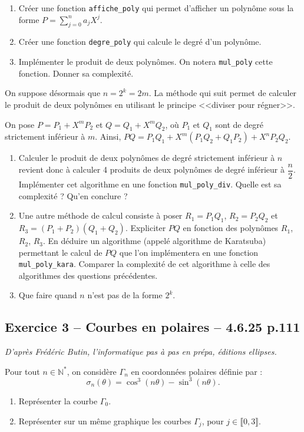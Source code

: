 \documentclass[10pt,fleqn]{article} %
\begin{document}
\begin{multicols}{2}
\begin{enumerate}
\item Créer une fonction \texttt{affiche\_poly} qui permet d'afficher un polynôme sous la forme $P=\sum\limits_{j=0}^{n}a_j X^j$.
\item Créer une fonction \texttt{degre\_poly} qui calcule le degré d'un polynôme.
\item Implémenter le produit de deux polynômes. On notera \texttt{mul\_poly} cette fonction. Donner sa complexité.
\end{enumerate}
On suppose désormais que $n=2^k=2m$. La méthode qui suit permet de calculer le produit de deux polynômes en utilisant le principe <<diviser pour régner>>. 

On pose $P=P_1+X^m P_2$ et $Q=Q_1+X^mQ_2$, où $P_1$ et $Q_1$ sont de degré strictement inférieur à $m$. Ainsi, $PQ=P_1Q_1+X^m\left(P_1Q_2 + Q_1P_2\right)+X^n P_2 Q_2$. 

\begin{enumerate}
\item Calculer le produit de deux polynômes de degré strictement inférieur à $n$ revient donc à calculer 4 produits de deux polynômes de degré inférieur à $\dfrac{n}{2}$. Implémenter cet algorithme en une fonction \texttt{mul\_poly\_div}. Quelle est sa complexité ? Qu'en conclure ?
\item Une autre méthode de calcul consiste à poser $R_1=P_1Q_1$, $R_2=P_2Q_2$ et $R_3=\left(P_1+P_2 \right)\left(Q_1+Q_2 \right)$. Expliciter $PQ$ en fonction des polynômes $R_1$, $R_2$, $R_3$. En déduire un algorithme (appelé algorithme de Karatsuba) permettant le calcul de $PQ$ que l'on implémentera en une fonction \texttt{mul\_poly\_kara}. Comparer la complexité de cet algorithme à celle des algorithmes des questions précédentes. 
\item Que faire quand $n$ n'est pas de la forme $2^k$.
\end{enumerate}


\subsection*{Exercice 3 -- Courbes en polaires -- 4.6.25 p.111}
\begin{flushright}
\textit{D'après Frédéric Butin, l'informatique pas à pas en prépa, éditions ellipses.}
\end{flushright}

Pour tout $n \in \mathbb{N}^*$, on considère $\Gamma_n$ en coordonnées polaires définie par :
$$
\sigma_n(\theta) = \cos^3 \left( n\theta\right) - \sin^3 \left( n\theta\right).
$$
\begin{enumerate}
\item Représenter la courbe $\Gamma_0$.
\item Représenter sur un même graphique les courbes $\Gamma_j$, pour $j \in \llbracket 0,3\rrbracket $.
\end{enumerate}



\end{multicols}
\end{document}
